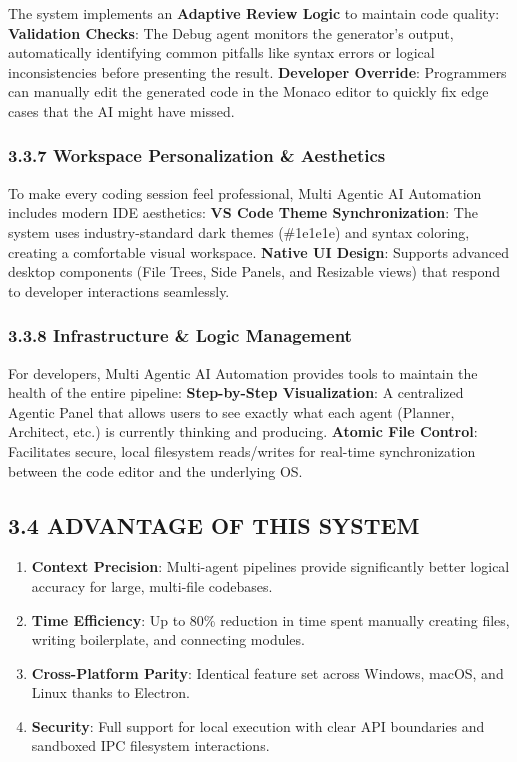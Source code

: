 \documentclass[
  12pt,
]{article}
\providecommand{\tightlist}{%
  \setlength{\itemsep}{0pt}\setlength{\parskip}{0pt}}
\begin{document}
The system implements an \textbf{Adaptive Review Logic} to maintain code
quality: \textbf{Validation Checks}: The Debug agent monitors the
generator's output, automatically identifying common pitfalls like
syntax errors or logical inconsistencies before presenting the result.
\textbf{Developer Override}: Programmers can manually edit the generated
code in the Monaco editor to quickly fix edge cases that the AI might
have missed.

\subsubsection{3.3.7 Workspace Personalization \&
Aesthetics}\label{workspace-personalization-aesthetics}

To make every coding session feel professional, Multi Agentic AI
Automation includes modern IDE aesthetics: \textbf{VS Code Theme
Synchronization}: The system uses industry-standard dark themes
(\#1e1e1e) and syntax coloring, creating a comfortable visual workspace.
\textbf{Native UI Design}: Supports advanced desktop components (File
Trees, Side Panels, and Resizable views) that respond to developer
interactions seamlessly.

\subsubsection{3.3.8 Infrastructure \& Logic
Management}\label{infrastructure-logic-management}

For developers, Multi Agentic AI Automation provides tools to maintain
the health of the entire pipeline: \textbf{Step-by-Step Visualization}:
A centralized Agentic Panel that allows users to see exactly what each
agent (Planner, Architect, etc.) is currently thinking and producing.
\textbf{Atomic File Control}: Facilitates secure, local filesystem
reads/writes for real-time synchronization between the code editor and
the underlying OS.

\subsection{3.4 ADVANTAGE OF THIS
SYSTEM}\label{advantage-of-this-system}

\begin{enumerate}
\def\labelenumi{\arabic{enumi}.}
\tightlist
\item
  \textbf{Context Precision}: Multi-agent pipelines provide
  significantly better logical accuracy for large, multi-file codebases.
\item
  \textbf{Time Efficiency}: Up to 80\% reduction in time spent manually
  creating files, writing boilerplate, and connecting modules.
\item
  \textbf{Cross-Platform Parity}: Identical feature set across Windows,
  macOS, and Linux thanks to Electron.
\item
  \textbf{Security}: Full support for local execution with clear API
  boundaries and sandboxed IPC filesystem interactions.
\end{enumerate}
\end{document}
